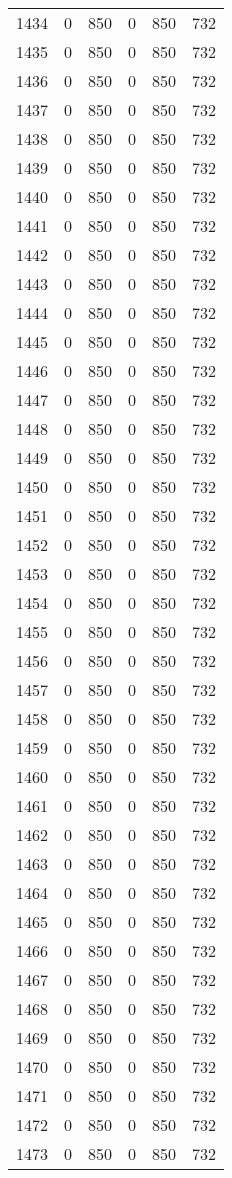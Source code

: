 \documentclass[a4paper]{ctexart}
\begin{document}
\begin{longtable}{p{1cm}|p{2cm}|p{2cm}|p{2cm}|P{2cm}|p{2cm}}
		1434&0&850&0&850&732\\
		1435&0&850&0&850&732\\
		1436&0&850&0&850&732\\
		1437&0&850&0&850&732\\
		1438&0&850&0&850&732\\
		1439&0&850&0&850&732\\
		1440&0&850&0&850&732\\
		1441&0&850&0&850&732\\
		1442&0&850&0&850&732\\
		1443&0&850&0&850&732\\
		1444&0&850&0&850&732\\
		1445&0&850&0&850&732\\
		1446&0&850&0&850&732\\
		1447&0&850&0&850&732\\
		1448&0&850&0&850&732\\
		1449&0&850&0&850&732\\
		1450&0&850&0&850&732\\
		1451&0&850&0&850&732\\
		1452&0&850&0&850&732\\
		1453&0&850&0&850&732\\
		1454&0&850&0&850&732\\
		1455&0&850&0&850&732\\
		1456&0&850&0&850&732\\
		1457&0&850&0&850&732\\
		1458&0&850&0&850&732\\
		1459&0&850&0&850&732\\
		1460&0&850&0&850&732\\
		1461&0&850&0&850&732\\
		1462&0&850&0&850&732\\
		1463&0&850&0&850&732\\
		1464&0&850&0&850&732\\
		1465&0&850&0&850&732\\
		1466&0&850&0&850&732\\
		1467&0&850&0&850&732\\
		1468&0&850&0&850&732\\
		1469&0&850&0&850&732\\
		1470&0&850&0&850&732\\
		1471&0&850&0&850&732\\
		1472&0&850&0&850&732\\
		1473&0&850&0&850&732\\

\end{longtable}
\end{document}
